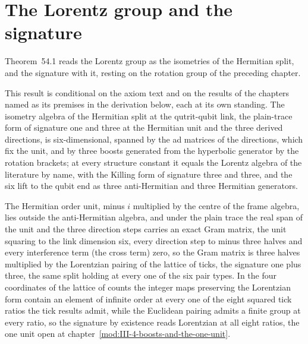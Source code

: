 \section{The Lorentz group and the signature}\label{mod:III-3-lorentz-group-and-the-signature}
\label{narr:open:3-3}Theorem~54.1 reads the Lorentz group as the isometries of the Hermitian split, and the signature with it, resting on the rotation group of the preceding chapter.
\begin{chconditional}\label{box:III-3-lorentz-group-and-the-signature:1}
This result is conditional on the axiom text and on the results of the chapters named as its premises in the derivation below, each at its own standing.
The isometry algebra of the Hermitian split at the qutrit-qubit link, the plain-trace form of signature one and three at the Hermitian unit and the three derived directions, is six-dimensional, spanned by the ad matrices of the directions, which fix the unit, and by three boosts generated from the hyperbolic generator by the rotation brackets; at every structure constant it equals the Lorentz algebra of the literature by name, with the Killing form of signature three and three, and the six lift to the qubit end as three anti-Hermitian and three Hermitian generators.
\end{chconditional}
The Hermitian order unit, minus $i$ multiplied by the centre of the frame algebra, lies outside the anti-Hermitian algebra, and under the plain trace the real span of the unit and the three direction steps carries an exact Gram matrix, the unit squaring to the link dimension six, every direction step to minus three halves and every interference term (the cross term) zero, so the Gram matrix is three halves multiplied by the Lorentzian pairing of the lattice of ticks, the signature one plus three, the same split holding at every one of the six pair types.
In the four coordinates of the lattice of counts the integer maps preserving the Lorentzian form contain an element of infinite order at every one of the eight squared tick ratios the tick results admit, while the Euclidean pairing admits a finite group at every ratio, so the signature by existence reads Lorentzian at all eight ratios, the one unit open at chapter~\ref{mod:III-4-boosts-and-the-one-unit}.
